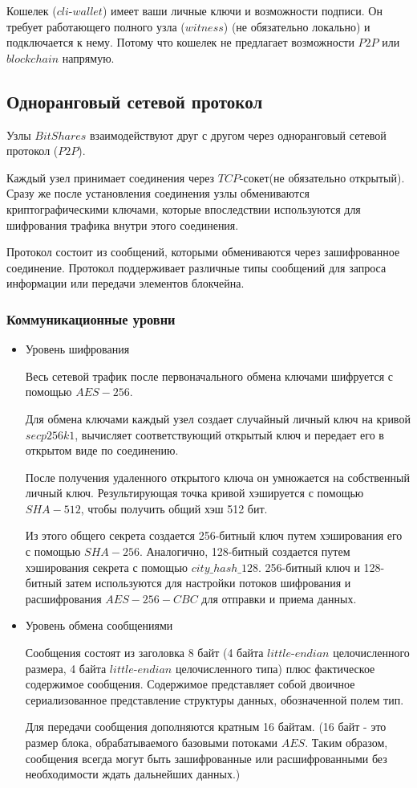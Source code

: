 \documentclass[a4paper, 14pt]{extarticle}
\begin{document}
Кошелек ($cli$-$wallet$) имеет ваши личные ключи и возможности подписи. Он требует работающего полного узла ($witness$) (не обязательно локально) и подключается к нему. Потому что кошелек не предлагает возможности $P2P$ или $blockchain$ напрямую.

\subsection{Одноранговый сетевой протокол}
Узлы $BitShares$ взаимодействуют друг с другом через одноранговый сетевой протокол ($P2P$).

Каждый узел принимает соединения через $TCP$-сокет(не обязательно открытый). Сразу же после установления соединения узлы обмениваются криптографическими ключами, которые впоследствии используются для шифрования трафика внутри этого соединения.

Протокол состоит из сообщений, которыми обмениваются через зашифрованное соединение. Протокол поддерживает различные типы сообщений для запроса информации или передачи элементов блокчейна.

\subsubsection{Коммуникационные уровни}

\begin{itemize}
    \item Уровень шифрования

    Весь сетевой трафик после первоначального обмена ключами шифруется с помощью $AES-256$.

    Для обмена ключами каждый узел создает случайный личный ключ на кривой $secp256k1$, вычисляет соответствующий открытый ключ и передает его в открытом виде по соединению.

    После получения удаленного открытого ключа он умножается на собственный личный ключ. Результирующая точка кривой хэшируется с помощью $SHA-512$, чтобы получить общий хэш 512 бит.

    Из этого общего секрета создается 256-битный ключ путем хэширования его с помощью $SHA-256$. Аналогично, 128-битный создается путем хэширования секрета с помощью $city\_hash\_128$. 256-битный ключ и 128-битный затем используются для настройки потоков шифрования и расшифрования $AES-256-CBC$ для отправки и приема данных.
    \item Уровень обмена сообщениями

    Сообщения состоят из заголовка 8 байт (4 байта $little$-$endian$ целочисленного размера, 4 байта $little$-$endian$ целочисленного типа) плюс фактическое содержимое сообщения. Содержимое представляет собой двоичное сериализованное представление структуры данных, обозначенной полем тип.

    Для передачи сообщения дополняются кратным 16 байтам. (16 байт - это размер блока, обрабатываемого базовыми потоками $AES$. Таким образом, сообщения всегда могут быть зашифрованные или расшифрованными без необходимости ждать дальнейших данных.)
\end{itemize}
\end{document}
